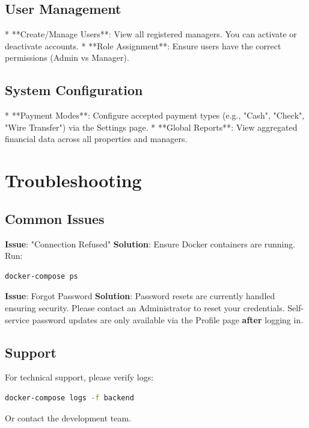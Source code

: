 \documentclass[12pt,a4paper]{article}
\begin{document}
\subsection{User Management}
*   **Create/Manage Users**: View all registered managers. You can activate or deactivate accounts.
*   **Role Assignment**: Ensure users have the correct permissions (Admin vs Manager).

\subsection{System Configuration}
*   **Payment Modes**: Configure accepted payment types (e.g., "Cash", "Check", "Wire Transfer") via the Settings page.
*   **Global Reports**: View aggregated financial data across all properties and managers.

\section{Troubleshooting}

\subsection{Common Issues}

\textbf{Issue}: "Connection Refused"
\textbf{Solution}: Ensure Docker containers are running. Run:
\begin{lstlisting}[language=bash]
docker-compose ps
\end{lstlisting}

\textbf{Issue}: Forgot Password
\textbf{Solution}: Password resets are currently handled ensuring security. Please contact an Administrator to reset your credentials. Self-service password updates are only available via the Profile page \textbf{after} logging in.

\subsection{Support}
For technical support, please verify logs:
\begin{lstlisting}[language=bash]
docker-compose logs -f backend
\end{lstlisting}
Or contact the development team.
\end{document}
